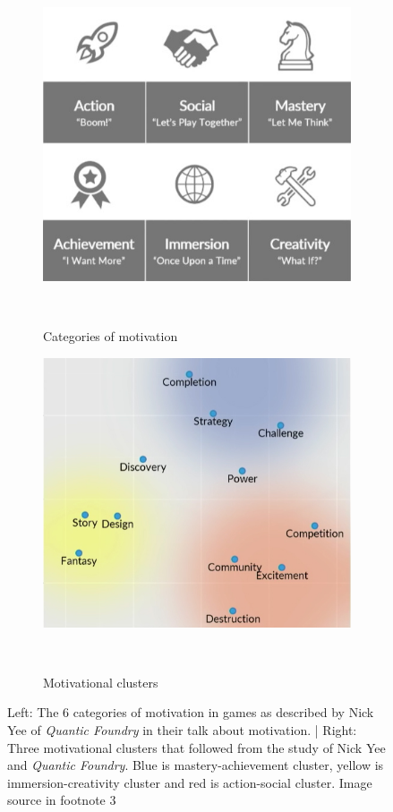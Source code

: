 \begin{figure}
	\centering
	\begin{subfigure}[b]{0.49\columnwidth}
		\includegraphics[width=\textwidth]{./figures/motivation}
		\caption[motivation]{Categories of motivation}~\label{fig:gameMotivation}
	\end{subfigure}
	\begin{subfigure}[b]{0.49\columnwidth}
		\includegraphics[width=\textwidth]{./figures/clusters}
		\caption[motivation]{Motivational clusters}~\label{fig:motivationClusters}
	\end{subfigure}
	\caption[]{Left: The 6 categories of motivation in games as described by Nick Yee of \textit{Quantic Foundry} in their talk about motivation. | Right: Three motivational clusters that followed from the study of Nick Yee and \textit{Quantic Foundry}. Blue is mastery-achievement cluster, yellow is immersion-creativity cluster and red is action-social cluster. Image source in footnote 3\textcolor{white}{\footnotemark[3]}}
\end{figure}


